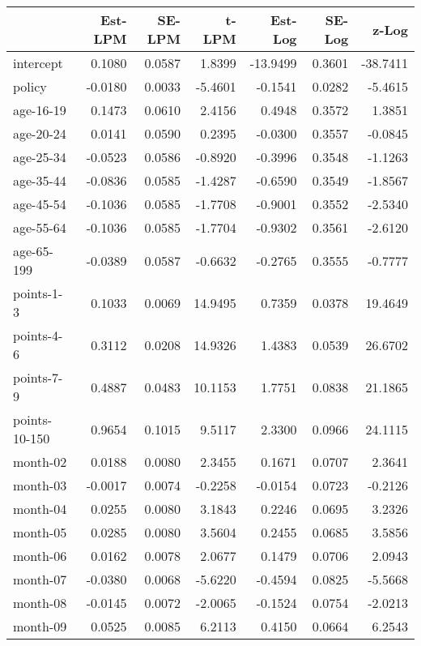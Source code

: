 \documentclass[10pt]{article}
\begin{document}
\begin{table}[ht]
\centering
\begin{tabular}{lrrrrrr}
  \hline
 & Est-LPM & SE-LPM & t-LPM & Est-Log & SE-Log & z-Log \\ 
  \hline
intercept & 0.1080 & 0.0587 & 1.8399 & -13.9499 & 0.3601 & -38.7411 \\ 
  policy & -0.0180 & 0.0033 & -5.4601 & -0.1541 & 0.0282 & -5.4615 \\ 
  age-16-19 & 0.1473 & 0.0610 & 2.4156 & 0.4948 & 0.3572 & 1.3851 \\ 
  age-20-24 & 0.0141 & 0.0590 & 0.2395 & -0.0300 & 0.3557 & -0.0845 \\ 
  age-25-34 & -0.0523 & 0.0586 & -0.8920 & -0.3996 & 0.3548 & -1.1263 \\ 
  age-35-44 & -0.0836 & 0.0585 & -1.4287 & -0.6590 & 0.3549 & -1.8567 \\ 
  age-45-54 & -0.1036 & 0.0585 & -1.7708 & -0.9001 & 0.3552 & -2.5340 \\ 
  age-55-64 & -0.1036 & 0.0585 & -1.7704 & -0.9302 & 0.3561 & -2.6120 \\ 
  age-65-199 & -0.0389 & 0.0587 & -0.6632 & -0.2765 & 0.3555 & -0.7777 \\ 
  points-1-3 & 0.1033 & 0.0069 & 14.9495 & 0.7359 & 0.0378 & 19.4649 \\ 
  points-4-6 & 0.3112 & 0.0208 & 14.9326 & 1.4383 & 0.0539 & 26.6702 \\ 
  points-7-9 & 0.4887 & 0.0483 & 10.1153 & 1.7751 & 0.0838 & 21.1865 \\ 
  points-10-150 & 0.9654 & 0.1015 & 9.5117 & 2.3300 & 0.0966 & 24.1115 \\ 
  month-02 & 0.0188 & 0.0080 & 2.3455 & 0.1671 & 0.0707 & 2.3641 \\ 
  month-03 & -0.0017 & 0.0074 & -0.2258 & -0.0154 & 0.0723 & -0.2126 \\ 
  month-04 & 0.0255 & 0.0080 & 3.1843 & 0.2246 & 0.0695 & 3.2326 \\ 
  month-05 & 0.0285 & 0.0080 & 3.5604 & 0.2455 & 0.0685 & 3.5856 \\ 
  month-06 & 0.0162 & 0.0078 & 2.0677 & 0.1479 & 0.0706 & 2.0943 \\ 
  month-07 & -0.0380 & 0.0068 & -5.6220 & -0.4594 & 0.0825 & -5.5668 \\ 
  month-08 & -0.0145 & 0.0072 & -2.0065 & -0.1524 & 0.0754 & -2.0213 \\ 
  month-09 & 0.0525 & 0.0085 & 6.2113 & 0.4150 & 0.0664 & 6.2543 \\ 

\end{tabular}
\end{table}
\end{document}
